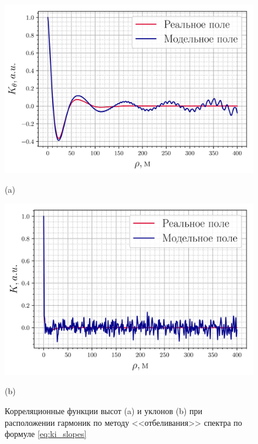 \begin{figure}[h!]
    \centering
    \begin{minipage}{0.49\linewidth}
        \centering
        \includegraphics[width=\linewidth]{fig/correlation_height_slopes2.png}

        (a)
    \end{minipage}
    \begin{minipage}{0.49\linewidth}
        \centering
        \includegraphics[width=\linewidth]{fig/correlation_angles_slopes2.png}

        (b)


    \end{minipage}
    \caption{ Корреляционные функции высот (a) и уклонов (b) при расположении гармоник
    по методу <<отбеливания>> спектра по формуле \eqref{eq:ki_slopes} }
    \label{fig:ki_slopes}
\end{figure}

